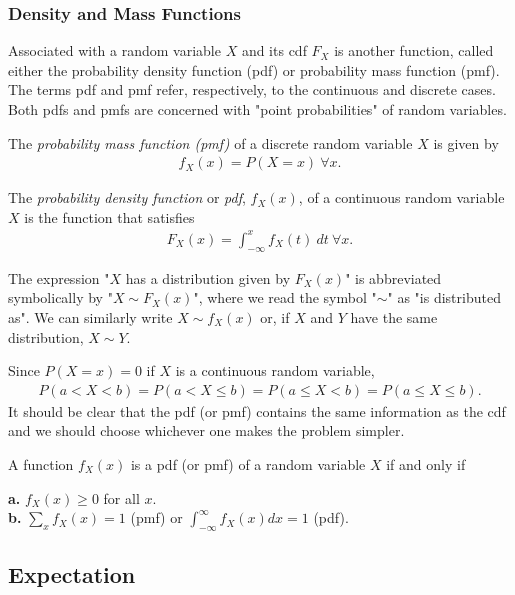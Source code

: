 \subsubsection{Density and Mass Functions}
Associated with a random variable $X$ and its cdf $F_X$ is another function, called either the probability density function (pdf) or probability mass function (pmf). The terms pdf and pmf refer, respectively, to the continuous and discrete cases. Both pdfs and pmfs are concerned with "point probabilities" of random variables.
\begin{defn}
    The \textit{probability mass function (pmf)} of a discrete random variable $X$ is given by
    \begin{align*}
        f_X(x) = P(X = x)\ \forall x.
    \end{align*}
\end{defn}
\begin{defn}
    The \textit{probability density function} or \textit{pdf}, $f_X(x)$, of a continuous random variable $X$ is the function that satisfies
    \begin{align*}
        F_X(x) = \int^x_{-\infty} f_X(t)\ dt\ \forall x.
    \end{align*}
\end{defn}
\begin{note}[notation]
    The expression "$X$ has a distribution given by $F_X(x)$" is abbreviated symbolically by "$X \sim F_X(x)$", where we read the symbol "$\sim$" as "is distributed as". We can similarly write $X \sim f_X(x)$ or, if $X$ and $Y$ have the same distribution, $X \sim Y$.
\end{note}
Since $P(X = x) = 0$ if $X$ is a continuous random variable,
\begin{align*}
    P(a < X < b) = P(a < X \leq b) = P(a \leq X < b) = P(a \leq X \leq b).
\end{align*}
It should be clear that the pdf (or pmf) contains the same information as the cdf and we should choose whichever one makes the problem simpler.
\begin{thm}
    A function $f_X(x)$ is a pdf (or pmf) of a random variable $X$ if and only if

    \textbf{a.} $f_X(x) \geq 0$ for all $x$. \\
    \textbf{b.} $\sum_x f_X(x) = 1$ (pmf) or $\int^\infty_{-\infty} f_X(x) dx = 1$ (pdf).
\end{thm}

\subsection{Expectation}

